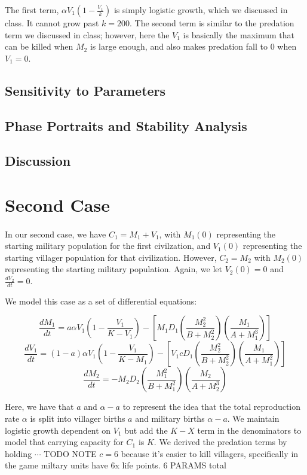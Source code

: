 \documentclass[12pt]{article}
\begin{document}
The first term, $\alpha V_1(1-\frac{V_1}{k})$ is simply logistic growth, which we discussed in class. It cannot grow past $k = 200$. The second term is similar to the predation term we discussed in class; however, here the $V_1$ is basically the maximum that can be killed when $M_2$ is large enough, and also makes predation fall to $0$ when $V_1 = 0$.

\subsection{Sensitivity to Parameters}

\subsection{Phase Portraits and Stability Analysis}

\subsection{Discussion}

\section{Second Case} 
\paragraph{}
In our second case, we have $C_1 = M_1 + V_1$, with $M_1(0)$ representing the starting military population for the first civilzation, and $V_1(0)$ representing the starting villager population for that civilization. However, $C_2 = M_2$ with $M_2(0)$ representing the starting military population. Again, we let $V_2(0) = 0$ and $\frac{dV_2}{dt} = 0$. \par

We model this case as a set of differential equations: 

$$\frac{dM_1}{dt}=a \alpha V_1(1-\frac{V_1}{K-V_1})-[M_1D_1(\frac{M_2^2}{B+M_2^2})(\frac{M_1}{A+M_1^3})]$$
$$\frac{dV_1}{dt}=(1 - a) \alpha V_1(1-\frac{V_1}{K-M_1})-[V_1cD_1(\frac{M_2^2}{B+M_2^2})(\frac{M_1}{A +M_1^2})]$$
$$\frac{dM_2}{dt}=-M_2 D_2(\frac{M_1^2}{B+M_1^2})(\frac{M_2}{A +M_2^3}) $$

Here, we have that $a$ and $\alpha - a$ to represent the idea that the total reproduction rate $\alpha$ is split into villager births $a$ and military births $\alpha - a$. We maintain logistic growth dependent on $V_1$ but add the $K - X$ term in the denominators to model that carrying capacity for $C_1$ is $K$. We derived the predation terms by holding $\cdots$ TODO NOTE $c = 6$ because it's easier to kill villagers, specifically in the game miltary units have 6x life points. 6 PARAMS total
\end{document}
